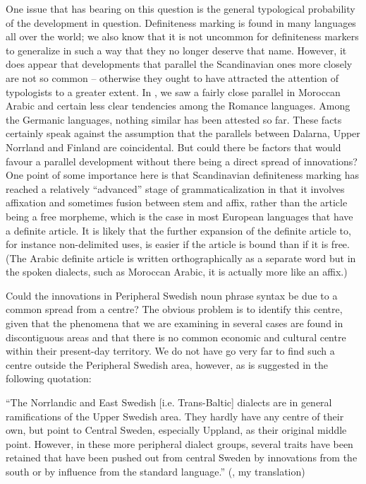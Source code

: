 One issue that has bearing on this question is the general typological probability of the development in question. Definiteness marking is found in many languages all over the world; we also know that it is not uncommon for definiteness markers to generalize in such a way that they no longer deserve that name. However, it does appear that developments that parallel the Scandinavian ones more closely are not so common – otherwise they ought to have attracted the attention of typologists to a greater extent. In , we saw a fairly close parallel in Moroccan Arabic and certain less clear tendencies among the Romance languages. Among the Germanic languages, nothing similar has been attested so far. These facts certainly speak against the assumption that the parallels between Dalarna, Upper Norrland and Finland are coincidental. But could there be factors that would favour a parallel development without there being a direct spread of innovations? One point of some importance here is that Scandinavian definiteness marking has reached a relatively “advanced” stage of grammaticalization in that it involves affixation and sometimes fusion between stem and affix, rather than the article being a free morpheme, which is the case in most European languages that have a definite article. It is likely that the further expansion of the definite article to, for instance non-delimited uses, is easier if the article is bound than if it is free. (The Arabic definite article is written orthographically as a separate word but in the spoken dialects, such as Moroccan Arabic, it is actually more like an affix.) 

Could the innovations in Peripheral Swedish noun phrase syntax be due to a common spread from a centre? The obvious problem is to identify this centre, given that the phenomena that we are examining in several cases are found in discontiguous areas and that there is no common economic and cultural centre within their present-day territory. We do not have go very far to find such a centre outside the Peripheral Swedish area, however, as is suggested in the following quotation: 

“The Norrlandic and East Swedish [i.e. Trans-Baltic] dialects are in general ramifications of the Upper Swedish area. They hardly have any centre of their own, but point to Central Sweden, especially Uppland, as their original middle point. However, in these more peripheral dialect groups, several traits have been retained that have been pushed out from central Sweden by innovations from the south or by influence from the standard language.” (\citet[51]{Wessén1966}, my translation)

